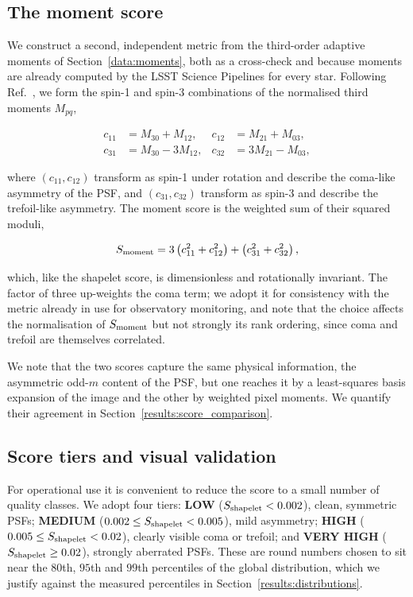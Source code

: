 \documentclass[]{spie}
\newcommand{\sshape}{S_{\rm shapelet}}
\newcommand{\smom}{S_{\rm moment}}
\begin{document}
\subsection{The moment score}
\label{method:moment_score}

We construct a second, independent metric from the third-order adaptive moments of
Section~\ref{data:moments}, both as a cross-check and because moments are already computed
by the LSST Science Pipelines \cite{Pipelines2026} for every star. Following
Ref.~, we form the spin-1 and spin-3 combinations of the normalised
third moments $M_{pq}$,

\begin{align}
c_{11} &= M_{30} + M_{12},  &  c_{12} &= M_{21} + M_{03}, \label{eq:coma}\\
c_{31} &= M_{30} - 3 M_{12}, &  c_{32} &= 3 M_{21} - M_{03}, \label{eq:trefoil}
\end{align}

where $(c_{11}, c_{12})$ transform as spin-1 under rotation and describe the coma-like
asymmetry of the PSF, and $(c_{31}, c_{32})$ transform as spin-3 and describe the
trefoil-like asymmetry. The moment score is the weighted sum of their squared moduli,

\begin{equation}
\smom = 3\left(c_{11}^2 + c_{12}^2\right) + \left(c_{31}^2 + c_{32}^2\right),
\label{eq:moment_score}
\end{equation}

which, like the shapelet score, is dimensionless and rotationally invariant. The factor of
three up-weights the coma term; we adopt it for consistency with the metric already in use
for observatory monitoring, and note that the choice affects the normalisation of $\smom$
but not strongly its rank ordering, since coma and trefoil are themselves correlated.

We note that the two scores capture the same physical information, the asymmetric odd-$m$
content of the PSF, but one reaches it by a least-squares basis expansion of the image and
the other by weighted pixel moments. We quantify their agreement in
Section~\ref{results:score_comparison}.

\subsection{Score tiers and visual validation}
\label{method:tiers}

For operational use it is convenient to reduce the score to a small number of quality
classes. We adopt four tiers: \textbf{LOW} ($\sshape < 0.002$), clean, symmetric PSFs;
\textbf{MEDIUM} ($0.002 \le \sshape < 0.005$), mild asymmetry; \textbf{HIGH}
($0.005 \le \sshape < 0.02$), clearly visible coma or trefoil; and \textbf{VERY HIGH}
($\sshape \ge 0.02$), strongly aberrated PSFs. These are round numbers chosen to sit near
the $80$th, $95$th and $99$th percentiles of the global distribution, which we justify
against the measured percentiles in Section~\ref{results:distributions}.
\end{document}

